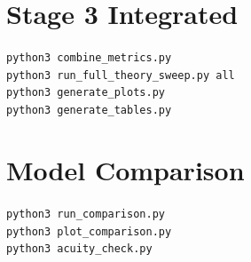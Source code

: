 \documentclass[11pt]{report}
\begin{document}
\section*{Stage 3 Integrated}
\texttt{python3 combine\_metrics.py} \\
\texttt{python3 run\_full\_theory\_sweep.py all} \\
\texttt{python3 generate\_plots.py} \\
\texttt{python3 generate\_tables.py}

\section*{Model Comparison}
\texttt{python3 run\_comparison.py} \\
\texttt{python3 plot\_comparison.py} \\
\texttt{python3 acuity\_check.py}
\end{document}
